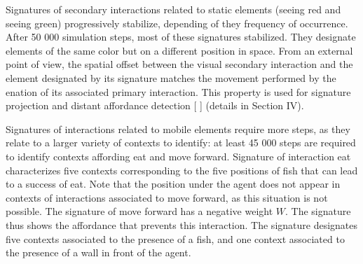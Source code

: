 \documentclass[conference]{IEEEtran}
\begin{document}
Signatures of secondary interactions related to static elements (seeing red and seeing green) progressively stabilize, depending of they frequency of occurrence. After 50 000 simulation steps, most of these signatures stabilized. They designate elements of the same color but on a different position in space. From an external point of view, the spatial offset between the visual secondary interaction and the element designated by its signature matches the movement performed by the enation of its associated primary interaction. This property is used for signature projection and distant affordance detection [ ] (details in Section IV).

Signatures of interactions related to mobile elements require more steps, as they relate to a larger variety of contexts to identify: at least 45 000 steps are required to identify contexts affording eat and move forward. Signature of interaction eat characterizes five contexts corresponding to the five positions of fish that can lead to a success of eat. Note that the position under the agent does not appear in contexts of interactions associated to move forward, as this situation is not possible. The signature of move forward has a negative weight $W$. The signature thus shows the affordance that prevents this interaction. The signature designates five contexts associated to the presence of a fish, and one context associated to the presence of a wall in front of the agent.

\end{document}

